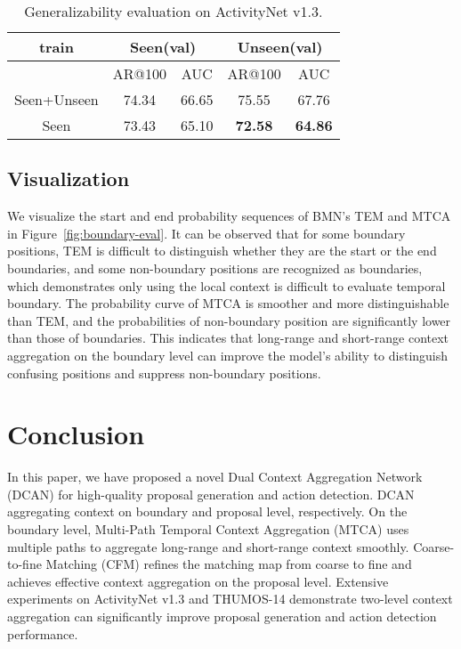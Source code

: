 \documentclass[letterpaper]{article} \usepackage{aaai22}  \usepackage{times}  \usepackage{helvet}  \usepackage{courier}  \usepackage[hyphens]{url}  \usepackage{graphicx} \urlstyle{rm} \def\UrlFont{\rm}  \usepackage{natbib}  \usepackage{caption} \DeclareCaptionStyle{ruled}{labelfont=normalfont,labelsep=colon,strut=off} \frenchspacing  \setlength{\pdfpagewidth}{8.5in}  \setlength{\pdfpageheight}{11in}  \usepackage{algorithm}
\begin{document}
\begin{table}[h]
\centering
\caption{Generalizability evaluation on ActivityNet v1.3.}
\label{gen}
\begin{tabular}{ccccc}

\hline
      train            & \multicolumn{2}{c}{Seen(val)} & \multicolumn{2}{c}{Unseen(val)} \\
                  \hline
                  & AR@100         & AUC          & AR@100          & AUC           \\
                  \hline
Seen+Unseen & 74.34          & 66.65        & 75.55           & 67.76        \\
Seen        & 73.43          & 65.10        & \textbf{72.58}           &\textbf{64.86} \\       \hline
\end{tabular}
\end{table}
















\subsection{Visualization}
We visualize the start and end probability sequences of BMN's TEM and MTCA in Figure~\ref{fig:boundary-eval}. 
It can be observed that for some boundary positions, TEM is difficult to distinguish whether they are the start or the end boundaries, and some non-boundary positions are recognized as boundaries, which demonstrates only using the local context is difficult to evaluate temporal boundary.
The probability curve of MTCA is smoother and more distinguishable than TEM, and the probabilities of non-boundary position are significantly lower than those of boundaries.
This indicates that long-range and short-range context aggregation on the boundary level can improve the model's ability to distinguish confusing positions and suppress non-boundary positions.





\section{Conclusion}
In this paper, we have proposed a novel Dual Context Aggregation Network (DCAN) for high-quality proposal generation and action detection.
DCAN aggregating context on boundary and proposal level, respectively.
On the boundary level, Multi-Path Temporal Context Aggregation (MTCA) uses multiple paths to aggregate long-range and short-range context smoothly.
Coarse-to-fine Matching (CFM) refines the matching map from coarse to fine and achieves effective context aggregation on the proposal level. 
Extensive experiments on ActivityNet v1.3 and THUMOS-14 demonstrate two-level context aggregation can significantly improve proposal generation and action detection performance.
\end{document}

